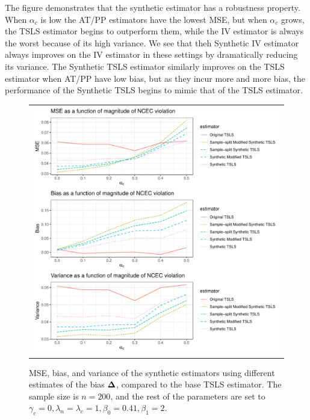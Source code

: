 \documentclass{article}
\begin{document}
%
The figure demonstrates that the synthetic estimator has a robustness property. When $\alpha_c$ is low the AT/PP estimators have the lowest MSE, but when $\alpha_c$ grows, the TSLS estimator begins to outperform them, while the IV estimator is always the worst because of its high variance. We see that theh Synthetic IV estimator always improves on the IV estimator in these settings by dramatically reducing its variance. The Synthetic TSLS estimator similarly improves on the TSLS estimator when AT/PP have low bias, but as they incur more and more bias, the performance of the Synthetic TSLS begins to mimic that of the TSLS estimator. 

\begin{figure}
\centering
\begin{tabular}{c}
\includegraphics[width =\textwidth]{figures/synthetics-compare-plot.pdf}
\end{tabular}\vspace{0.2in}
\caption{MSE, bias, and variance of the synthetic estimators using different estimates of the bias $\boldsymbol{\Delta}$, compared to the base TSLS estimator. The sample size is $n = 200$, and the rest of the parameters are set to $\gamma_c = 0, \lambda_n = \lambda_c = 1, \beta_0 = 0.41, \beta_1 = 2$.}\label{mse_plot_2}
\end{figure}
\end{document}
